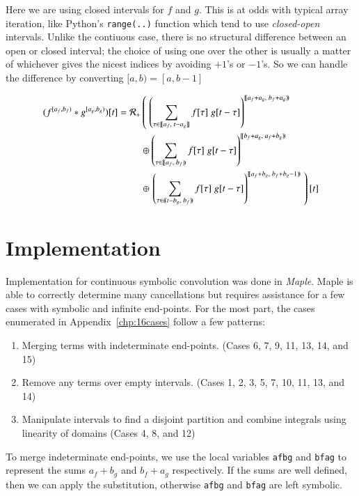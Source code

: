 Here we are using closed intervals for $f$ and $g$.
This is at odds with typical array iteration, like Python's \texttt{range(..)} function which tend to use \emph{closed-open} 
intervals.
Unlike the contiuous case, there is no structural difference between an open or closed interval; the choice of using one over 
the other is usually a matter of whichever gives the nicest indices by avoiding $+1$'s or $-1$'s.
So we can handle the difference by converting $[a,b) = [a,b-1]$


\begin{align}
	(f^{[a_f,b_f)} * g^{[a_g, b_g)})[t] = 
		\R[+] &\left( \; \left( 
			\sum_{\tau \in [\![a_f,\;t-a_g]\!]} f[\tau] \; g[t-\tau] \right)^{[\![a_f+a_g,\; b_f+a_g)\!)} 
				\right. \notag \\ &\oplus \left( 
			\sum_{\tau \in [\![a_f,\;b_f)\!)} f[\tau] \; g[t-\tau] \right)^{[\![b_f+a_g,\; a_f+b_g)\!)} 
				\notag \\ &\oplus \left. \left( 
			\sum_{\tau \in (\!(t-b_g,\;b_f)\!)} f[\tau] \; g[t-\tau] \right)^{[\![a_f+b_g,\; b_f+b_g-1)\!)} 
				\; \right)[t]
\end{align}





%
%
\section{Implementation}

Implementation for continuous symbolic convolution was done in \emph{Maple}.
Maple is able to correctly determine many cancellations but requires assistance for a few cases with symbolic and infinite
end-points.
For the most part, the cases enumerated in Appendix~\ref{chp:16cases} follow a few patterns:
\begin{enumerate}
	\item Merging terms with indeterminate end-points. (Cases 6, 7, 9, 11, 13, 14, and 15)
	\item Remove any terms over empty intervals. (Cases 1, 2, 3, 5, 7, 10, 11, 13, and 14)
	\item Manipulate intervals to find a disjoint partition and combine integrals using linearity of domains 
	(Cases 4, 8, and 12)
\end{enumerate}


To merge indeterminate end-points, we use the local variables \texttt{afbg} and \texttt{bfag} to represent the sums
$a_f+b_g$ and $b_f+a_g$ respectively.
If the sums are well defined, then we can apply the substitution, otherwise \texttt{afbg} and \texttt{bfag} are left symbolic.

